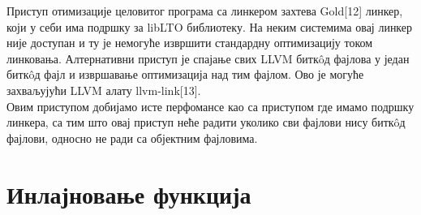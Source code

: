 \documentclass[12pt,oneside]{memoir}
\begin{document}
Приступ отимизације целовитог програма са линкером захтева Gold[12] линкер,
који у себи има подршку за libLTO библиотеку.
На неким системима овај линкер није доступан и ту је немогуће извршити стандардну
оптимизацију током линковања.
Алтернативни приступ је спајање свих LLVM битк\^{o}д фајлова у један битк\^{o}д фајл
и извршавање оптимизација над тим фајлом.
Ово је могуће захваљујући LLVM алату llvm-link[13].
\\
Овим приступом добијамо исте перфомансе као са приступом где имамо подршку линкера,
са тим што овај приступ неће радити уколико сви фајлови нису  битк\^{o}д фајлови,
односно не ради са објектним фајловима.


\section{Инлајновање функција}
\end{document}
